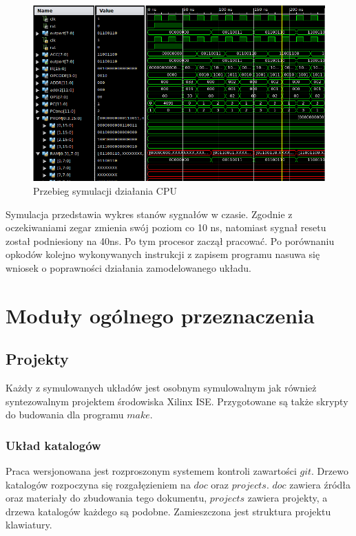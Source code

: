 \documentclass[a4paper,12pt]{article}
\begin{document}
\newpage

\begin{figure}[htb]
   \centering
   \includegraphics[width=18cm]{grafika/cpu.png}
   \caption*{Przebieg symulacji działania CPU}
\end{figure}

Symulacja przedstawia wykres stanów sygnałów w czasie. Zgodnie z oczekiwaniami zegar zmienia swój poziom co 10 ns, natomiast sygnał resetu został podniesiony na 40ns. Po tym procesor zaczął pracować. Po porównaniu opkodów kolejno wykonywanych instrukcji z zapisem programu nasuwa się wniosek o poprawności działania zamodelowanego układu.

\newpage

\section{Moduły ogólnego przeznaczenia}

\subsection{Projekty}
Każdy z symulowanych układów jest osobnym symulowalnym jak również syntezowalnym projektem środowiska Xilinx ISE. Przygotowane są także skrypty do budowania dla programu $make$.

\subsubsection{Układ katalogów}
Praca wersjonowana jest rozproszonym systemem kontroli zawartości $git$. Drzewo katalogów rozpoczyna się rozgałęzieniem na $doc$ oraz $projects$. $doc$ zawiera źródła oraz materiały do zbudowania tego dokumentu, $projects$ zawiera projekty, a drzewa katalogów każdego są podobne. Zamieszczona jest struktura projektu klawiatury.
\end{document}
